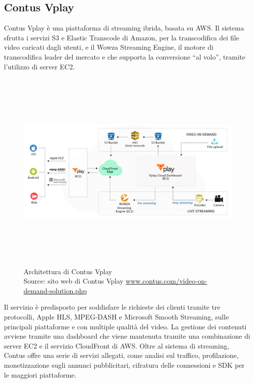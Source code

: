 	\subsection{Contus Vplay}
	Contus Vplay è una piattaforma di streaming ibrida, basata su \gls{AWS}. Il sistema sfrutta i servizi S3 e Elastic Transcode di Amazon, per la transcodifica dei file video caricati dagli utenti, e il Wowza Streaming Engine, il motore di transcodifica leader del mercato e che supporta la conversione ``al volo'', tramite l'utilizzo di server EC2.
	\begin{figure}[H]
		\begin{center}
			\includegraphics[width=16.5cm,height=10cm,keepaspectratio]{immagini/contus-vplay-cloud-architecture.jpg}
			\caption[Architettura di Contus Vplay]{Architettura di Contus Vplay
			\\
			Source: sito web di Contus Vplay \href{http://www.contus.com/video-on-demand-solution.php}{www.contus.com/video-on-demand-solution.php}}
		\end{center}
	\end{figure}
	Il servizio è predisposto per soddisfare le richieste dei clienti tramite tre protocolli, Apple HLS, MPEG-DASH e Microsoft Smooth Streaming, sulle principali piattaforme e con multiple qualità del video. La gestione dei contenuti avviene tramite una dashboard che viene mantenuta tramite una combinazione di server EC2 e il servizio CloudFront di \gls{AWS}. Oltre al sistema di streaming, Contus offre una serie di servizi allegati, come analisi sul traffico, profilazione, monetizzazione sugli annunci pubblicitari, cifratura delle connessioni e SDK per le maggiori piattaforme.

